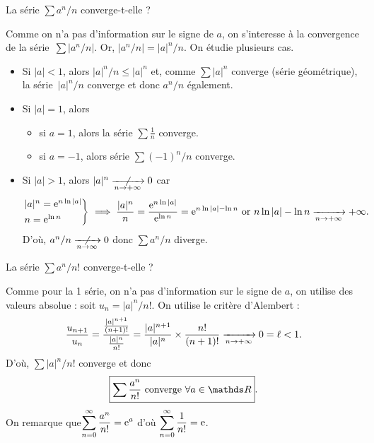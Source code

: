 \begin{exo}
	La série $\sum a^n / n$\/ converge-t-elle ?

	Comme on n'a pas d'information sur le signe de $a$, on s'interesse à la convergence de la série~$\sum \big|a^n / n\big|$. Or, $\big| a^n / n \big| = |a|^n / n$. On étudie plusieurs cas.
	\begin{itemize}
		\item Si $|a| < 1$, alors $|a|^n / n \le |a|^n$ et, comme $\sum |a|^n$\/ converge (série géométrique), la série~$|a|^n / n$\/ converge et donc $a^n / n$\/ également.
		\item Si $|a| = 1$, alors
			\begin{itemize}
				\item si $a = 1$, alors la série $\sum \frac{1}{n}$\/ converge.
				\item si $a = -1$, alors série $\sum (-1)^n / n$\/ converge.
			\end{itemize}
		\item Si $|a| > 1$, alors $|a|^n \centernot{\tendsto{n\to +\infty}} 0$ car
			\begin{align*}
				\begin{rcases*}
					|a|^n = \mathrm{e}^{n \ln |a|}\\
					n = \mathrm{e}^{\ln n}
				\end{rcases*} \implies \frac{|a|^n}{n} = \frac{\mathrm{e}^{n \ln |a|}}{\mathrm{e}^{\ln n}} = \mathrm{e}^{n \ln |a| - \ln n} \text{ or } n \ln |a| - \ln n \tendsto{n\to +\infty} +\infty.
			\end{align*}
			D'où, $a^n / n \centernot{\tendsto{n\to \infty}} 0$\/ donc $\sum a^n / n$\/ diverge.
	\end{itemize}

	La série $\sum a^n / n!$\/ converge-t-elle ?

	Comme pour la 1 série, on n'a pas d'information sur le signe de $a$, on utilise des valeurs absolue : soit $u_n = |a|^n / n!$. On utilise le critère d'{\sc Alembert}\/ : \[
		\frac{u_{n+1}}{u_n} = \frac{\frac{|a|^{n+1}}{(n+1)!}}{\frac{|a|^n}{n!}} = \frac{|a|^{n+1}}{|a|^n} \times \frac{n!}{(n+1)!} \xrightarrow[n\to +\infty]{} 0 = \ell < 1
	.\] D'où, $\sum |a|^n / n!$\/ converge et donc \[
		\boxed{\sum \frac{a^n}{n!} \text{ converge } \forall a \in \R}
	.\]
	On remarque que$\displaystyle\sum_{n=0}^{\infty} \frac{a^n}{n!} = \mathrm{e}^a$\/ d'où $\displaystyle \sum_{n=0}^\infty \frac{1}{n!} = \mathrm{e}$.
\end{exo}

\bigskip

